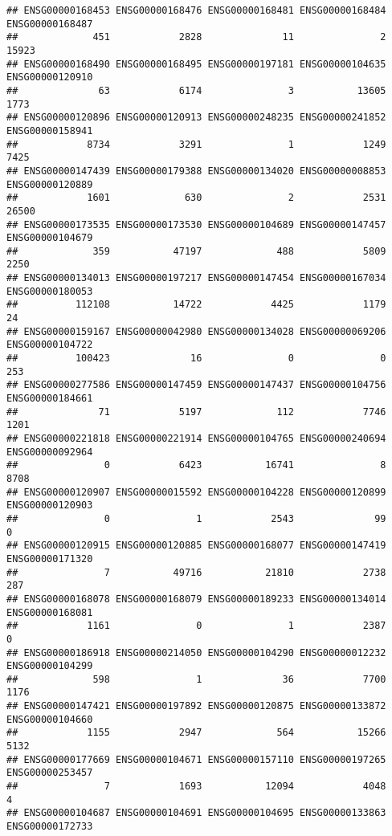 \documentclass[
]{article}
\begin{document}
\begin{verbatim}
## ENSG00000168453 ENSG00000168476 ENSG00000168481 ENSG00000168484 ENSG00000168487 
##             451            2828              11               2           15923 
## ENSG00000168490 ENSG00000168495 ENSG00000197181 ENSG00000104635 ENSG00000120910 
##              63            6174               3           13605            1773 
## ENSG00000120896 ENSG00000120913 ENSG00000248235 ENSG00000241852 ENSG00000158941 
##            8734            3291               1            1249            7425 
## ENSG00000147439 ENSG00000179388 ENSG00000134020 ENSG00000008853 ENSG00000120889 
##            1601             630               2            2531           26500 
## ENSG00000173535 ENSG00000173530 ENSG00000104689 ENSG00000147457 ENSG00000104679 
##             359           47197             488            5809            2250 
## ENSG00000134013 ENSG00000197217 ENSG00000147454 ENSG00000167034 ENSG00000180053 
##          112108           14722            4425            1179              24 
## ENSG00000159167 ENSG00000042980 ENSG00000134028 ENSG00000069206 ENSG00000104722 
##          100423              16               0               0             253 
## ENSG00000277586 ENSG00000147459 ENSG00000147437 ENSG00000104756 ENSG00000184661 
##              71            5197             112            7746            1201 
## ENSG00000221818 ENSG00000221914 ENSG00000104765 ENSG00000240694 ENSG00000092964 
##               0            6423           16741               8            8708 
## ENSG00000120907 ENSG00000015592 ENSG00000104228 ENSG00000120899 ENSG00000120903 
##               0               1            2543              99               0 
## ENSG00000120915 ENSG00000120885 ENSG00000168077 ENSG00000147419 ENSG00000171320 
##               7           49716           21810            2738             287 
## ENSG00000168078 ENSG00000168079 ENSG00000189233 ENSG00000134014 ENSG00000168081 
##            1161               0               1            2387               0 
## ENSG00000186918 ENSG00000214050 ENSG00000104290 ENSG00000012232 ENSG00000104299 
##             598               1              36            7700            1176 
## ENSG00000147421 ENSG00000197892 ENSG00000120875 ENSG00000133872 ENSG00000104660 
##            1155            2947             564           15266            5132 
## ENSG00000177669 ENSG00000104671 ENSG00000157110 ENSG00000197265 ENSG00000253457 
##               7            1693           12094            4048               4 
## ENSG00000104687 ENSG00000104691 ENSG00000104695 ENSG00000133863 ENSG00000172733 

\end{verbatim}
\end{document}
